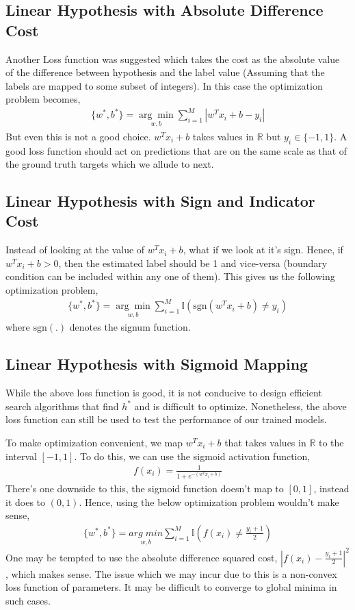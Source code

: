 \documentclass[12pt]{article}
\begin{document}
\subsection{Linear Hypothesis with Absolute Difference Cost}
Another Loss function was suggested which takes the cost as the absolute value of the difference between hypothesis and the label value (Assuming that the labels are mapped to some subset of integers). In this case the optimization problem becomes,
\begin{align*}
    \{w^{*}, b^{*}\} = \underset{w, b}{\arg\min} \sum_{i=1}^{M} |w^Tx_i+b - y_i| 
\end{align*}
But even this is not a good choice. $w^Tx_i + b$ takes values in $\mathbb{R}$ but $y_i \in \{-1,1\}$. A good loss function should act on predictions that are on the same scale as that of the ground truth targets which we allude to next. 

\subsection{Linear Hypothesis with Sign and Indicator Cost}
Instead of looking at the value of $w^Tx_i + b$, what if we look at it's sign. Hence, if $w^Tx_i+b > 0$, then the estimated label should be 1 and vice-versa (boundary condition can be included within any one of them). This gives us the following optimization problem,
\begin{align*}
    \{w^{*}, b^{*}\} = \underset{w, b}{\arg\min} \sum_{i=1}^{M} \mathbb{I}(\text{sgn}(w^Tx_i+b) \ne y_i)
\end{align*}
where $\text{sgn}(.)$ denotes the signum function.
\subsection{Linear Hypothesis with Sigmoid Mapping}
While the above loss function is good, it is not conducive to design efficient search algorithms that find $h^*$ and is difficult to optimize. Nonetheless, the above loss function can still be used to test the performance of our trained models. 

To make optimization convenient, we map $w^Tx_i+b$ that takes values in $\mathbb{R}$ to the interval $[-1,1]$. To do this, we can use the sigmoid activation function,
\begin{align*}
    f(x_i) = \frac{1}{1+e^{-(w^Tx_i + b)}}
\end{align*}
There's one downside to this, the sigmoid function doesn't map to $[0,1]$, instead it does to $(0,1)$. Hence, using the below optimization problem wouldn't make sense,
\begin{align*}
    \{w^{*}, b^{*}\} = \underset{w, b}{arg\;min} \sum_{i=1}^{M} \mathbb{I}(f(x_i) \ne \frac{y_i+1}{2}) 
\end{align*}
One may be tempted to use the absolute difference squared cost, $|f(x_i) - \frac{y_i+1}{2}|^2$, which makes sense. The issue which we may incur due to this is a non-convex loss function of parameters. It may be difficult to converge to global minima in such cases.\\
\newline
\end{document}
